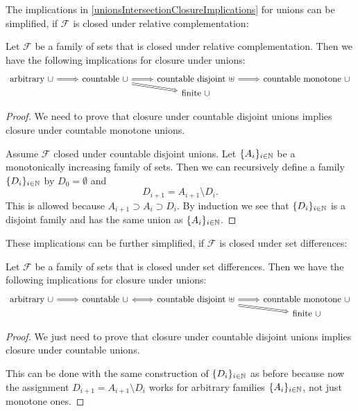 The implications in \ref{unionsIntersectionClosureImplications} for unions can be simplified, if $\mathcal{F}$ is closed under relative complementation:
\begin{lemma} \label{typesOfUnionsRelativeComplementation}
Let $\mathcal{F}$ be a family of sets that is closed under relative complementation. Then we have the following implications for closure under unions:
\[ \begin{tikzcd}[row sep=0em]
\text{arbitrary $\cup$} \arrow[r, Rightarrow] & \text{countable $\cup$} \arrow[r, Rightarrow] \arrow[dr, Rightarrow] & \text{countable disjoint $\uplus$} \arrow[r, Rightarrow] & \text{countable monotone $\cup$} \\
&& \text{finite $\cup$} &
\end{tikzcd} \]
\end{lemma}
\begin{proof}
We need to prove that closure under countable disjoint unions implies closure under countable monotone unions.

Assume $\mathcal{F}$ closed under countable disjoint unions. Let $\{A_i\}_{i\in \mathbb{N}}$ be a monotonically increasing family of sets. Then we can recursively define a family $\{D_i\}_{i\in \mathbb{N}}$ by $D_0=\emptyset$ and
\[ D_{i+1} = A_{i+1}\setminus D_i. \]
This is allowed because $A_{i+1}\supset A_i \supset D_i$. By induction we see that $\{D_i\}_{i\in \mathbb{N}}$ is a disjoint family and has the same union as $\{A_i\}_{i\in \mathbb{N}}$.
\end{proof}

These implications can be further simplified, if $\mathcal{F}$ is closed under set differences:
\begin{lemma}
Let $\mathcal{F}$ be a family of sets that is closed under set differences. Then we have the following implications for closure under unions:
\[ \begin{tikzcd}[row sep=0em]
\text{arbitrary $\cup$} \arrow[r, Rightarrow] & \text{countable $\cup$} \arrow[r, Leftrightarrow] & \text{countable disjoint $\uplus$} \arrow[r, Rightarrow] \arrow[dr, Rightarrow] & \text{countable monotone $\cup$} \\
&&& \text{finite $\cup$}
\end{tikzcd} \]
\end{lemma}
\begin{proof}
We just need to prove that closure under countable disjoint unions implies closure under countable unions.

This can be done with the same construction of $\{D_i\}_{i\in \mathbb{N}}$ as before because now the assignment $D_{i+1} = A_{i+1}\setminus D_i$ works for arbitrary families $\{A_i\}_{i\in \mathbb{N}}$, not just monotone ones.
\end{proof}

